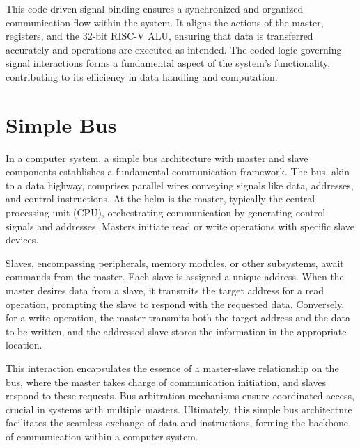 \documentclass[a4paper,12pt,english]{report}
\begin{document}
This code-driven signal binding ensures a synchronized and organized communication flow within the system. It aligns the actions of the master, registers, and the 32-bit RISC-V ALU, ensuring that data is transferred accurately and operations are executed as intended. The coded logic governing signal interactions forms a fundamental aspect of the system's functionality, contributing to its efficiency in data handling and computation.

\section{Simple Bus}
In a computer system, a simple bus architecture with master and slave components establishes a fundamental communication framework. The bus, akin to a data highway, comprises parallel wires conveying signals like data, addresses, and control instructions. At the helm is the master, typically the central processing unit (CPU), orchestrating communication by generating control signals and addresses. Masters initiate read or write operations with specific slave devices.
\vspace{2mm}

Slaves, encompassing peripherals, memory modules, or other subsystems, await commands from the master. Each slave is assigned a unique address. When the master desires data from a slave, it transmits the target address for a read operation, prompting the slave to respond with the requested data. Conversely, for a write operation, the master transmits both the target address and the data to be written, and the addressed slave stores the information in the appropriate location.

This interaction encapsulates the essence of a master-slave relationship on the bus, where the master takes charge of communication initiation, and slaves respond to these requests. Bus arbitration mechanisms ensure coordinated access, crucial in systems with multiple masters. Ultimately, this simple bus architecture facilitates the seamless exchange of data and instructions, forming the backbone of communication within a computer system.
\end{document}
